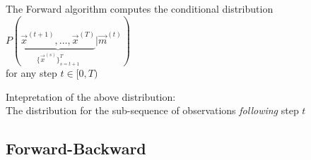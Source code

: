 \begin{frame}{\subsecname}

The Forward algorithm computes the conditional distribution
$
P(
\underbrace{\vec x^{(t+1)}, \ldots, \vec x^{(T)}
}_{
\{\vec x^{(s)}\}_{s=t+1}^T
} | \vec m^{(t)})
$\\
for any step $t \in \lbrack0, T)$

Intepretation of the above distribution:\\

The distribution for the sub-sequence of observations \emph{following} step $t$


\end{frame}

\subsection{Forward-Backward}

\begin{frame}
\end{frame}
